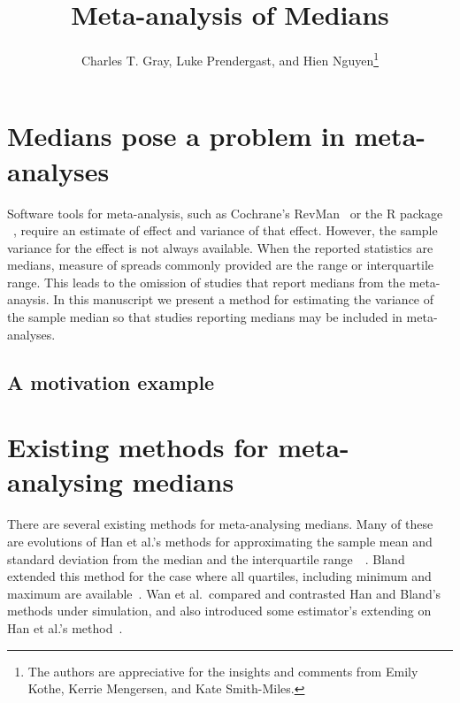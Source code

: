 \documentclass{article}
\title{Meta-analysis of Medians}
\author{Charles T. Gray, Luke Prendergast, and Hien Nguyen\thanks{
The authors are appreciative for the insights and comments from Emily Kothe, Kerrie Mengersen, and Kate Smith-Miles. 
}}
\begin{document}
\maketitle


\begin{abstract}
\end{abstract}


\section{Medians pose a problem in meta-analyses}

Software tools for meta-analysis, such as Cochrane's
RevMan~
or the R package ~,
require an estimate of effect and variance
of that effect. However, the sample variance for the effect is not always available.
When the reported statistics are medians, measure of spreads commonly provided
are the range or interquartile range. This leads to the omission of studies that report medians from the meta-anaysis. In this manuscript we present a method for estimating the variance of the sample median so that studies reporting medians may be included in meta-analyses.



\subsection{A motivation example}


\section{Existing methods for meta-analysing medians}

There are several existing methods for meta-analysing medians. Many of these are evolutions of Han et al.'s methods for approximating the sample mean and standard deviation from the median and the interquartile range~~. Bland extended this method for the case where all quartiles, including minimum and maximum are available~. Wan et al.\ compared and contrasted Han and Bland's methods under simulation, and also introduced some estimator's extending on Han et al.'s method~.
\end{document}
